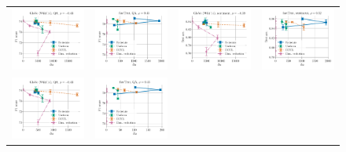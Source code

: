 \begin{figure}
	\centering
	\begin{tabular}{@{\hskip -0.0in}c@{\hskip -0.0in}c@{\hskip -0.0in}c@{\hskip -0.0in}c@{\hskip -0.0in}}
		\includegraphics[width=.245\linewidth]{figures/glove400k_qa_best-f1_vs_gram-large-dim-delta2-0_linx_stoc.pdf} &
		\includegraphics[width=.245\linewidth]{figures/fasttext1m_qa_best-f1_vs_gram-large-dim-delta2-0_linx_stoc.pdf} &
		\includegraphics[width=.245\linewidth]{figures/glove400k_sentiment_sst_test-acc_vs_gram-large-dim-delta2-0_linx_stoc.pdf} &
		\includegraphics[width=.245\linewidth]{figures/fasttext1m_sentiment_sst_test-acc_vs_gram-large-dim-delta2-0_linx_stoc.pdf} \\ [-1em]
		\includegraphics[width=.245\linewidth]{figures/glove400k_qa_best-f1_vs_gram-large-dim-delta2-1_linx_stoc.pdf} &
		\includegraphics[width=.245\linewidth]{figures/fasttext1m_qa_best-f1_vs_gram-large-dim-delta2-1_linx_stoc.pdf} &

\end{tabular}
\end{figure}
